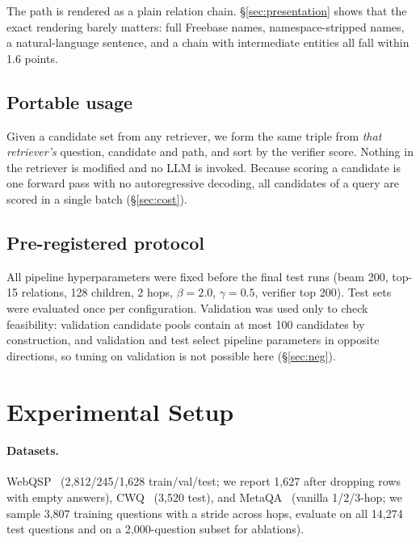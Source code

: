 \documentclass[sigconf,review,anonymous]{acmart}
\begin{document}
The path is rendered as a plain relation chain. \S\ref{sec:presentation} shows that the exact rendering barely matters: full Freebase names, namespace-stripped names, a natural-language sentence, and a chain with intermediate entities all fall within 1.6 points.\label{sec:presentation}

\subsection{Portable usage}
\label{sec:portable}
Given a candidate set from any retriever, we form the same triple from \emph{that retriever's} question, candidate and path, and sort by the verifier score. Nothing in the retriever is modified and no LLM is invoked. Because scoring a candidate is one forward pass with no autoregressive decoding, all candidates of a query are scored in a single batch (\S\ref{sec:cost}).

\subsection{Pre-registered protocol}
\label{sec:protocol}
All pipeline hyperparameters were fixed before the final test runs (beam 200, top-15 relations, 128 children, 2 hops, $\beta=2.0$, $\gamma=0.5$, verifier top 200). Test sets were evaluated once per configuration. Validation was used only to check feasibility: validation candidate pools contain at most 100 candidates by construction, and validation and test select pipeline parameters in opposite directions, so tuning on validation is not possible here (\S\ref{sec:neg}).

\section{Experimental Setup}
\label{sec:setup}

\paragraph{Datasets.}
WebQSP~\cite{berant2013webqsp} (2,812/245/1,628 train/val/test; we report 1,627 after dropping rows with empty answers), CWQ~\cite{talmor2018cwq} (3,520 test), and MetaQA~\cite{zhang2017metaqa} (vanilla 1/2/3-hop; we sample 3,807 training questions with a stride across hops, evaluate on all 14,274 test questions and on a 2,000-question subset for ablations).
\end{document}
